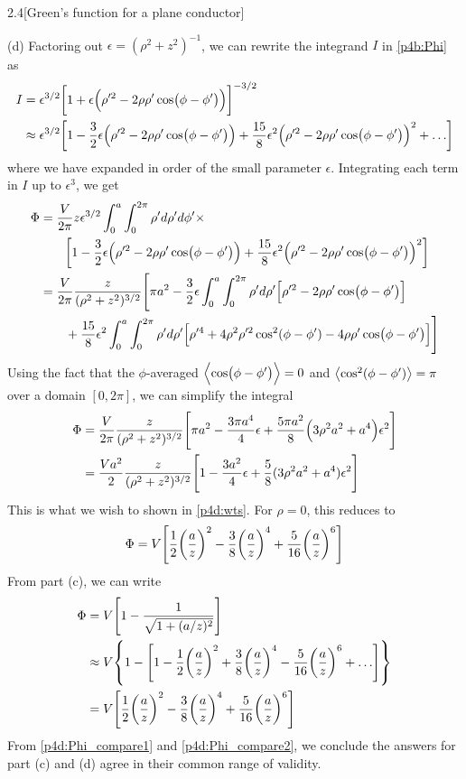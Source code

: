 \documentclass[12pt]{article}
\begin{document}
\begin{problem}{2.4}[Green's function for a plane conductor]
\begin{solution}
(d) Factoring out $\epsilon=(\rho^2+z^2)^{-1}$, we can rewrite the integrand
$I$ in \eqref{p4b:Phi} as
\begin{align}
    I
    &=\epsilon^{3/2}\qty[1+\epsilon\qty(\rho'^2-2\rho\rho'\cos(\phi-\phi'))]^{-3/2}\notag\\
    &\approx\epsilon^{3/2}\qty[1
        -\frac32\epsilon\qty(\rho'^2-2\rho\rho'\cos(\phi-\phi'))
        +\frac{15}{8}\epsilon^2\qty(\rho'^2-2\rho\rho'\cos(\phi-\phi'))^2
        +\hdots
    ]
\end{align}
where we have expanded in order of the small parameter $\epsilon$. Integrating
each term in $I$ up to $\epsilon^3$, we get
\begin{align}\label{p4d:Phi}
    \Phi&=\frac{V}{2\pi}z\epsilon^{3/2}\int_0^a\int_0^{2\pi}\rho'd\rho'd\phi'\times\notag\\
    &\qquad\qty[1
        -\frac32\epsilon\qty(\rho'^2-2\rho\rho'\cos(\phi-\phi'))
        +\frac{15}{8}\epsilon^2\qty(\rho'^2-2\rho\rho'\cos(\phi-\phi'))^2
    ]\notag\\
    &=\frac{V}{2\pi}\frac{z}{(\rho^2+z^2)^{3/2}}\Bigg[
        \pi
        a^2-\frac32\epsilon\int_0^a\int_0^{2\pi}\rho'd\rho'\qty[\rho'^2-2\rho\rho'\cos(\phi-\phi')]\notag\\
    &\qquad+\frac{15}{8}\epsilon^2\int_0^a\int_0^{2\pi}\rho'd\rho'\qty[\rho'^4+4\rho^2\rho'^2\cos^2(\phi-\phi')-4\rho\rho'\cos(\phi-\phi')]
    \Bigg]
\end{align}
Using the fact that the $\phi$-averaged $\expval{\cos(\phi-\phi')}=0$ and
$\expval{\cos^2(\phi-\phi')}=\pi$ over a domain $[0,2\pi]$, we can simplify the
integral
\begin{align}\label{p4d:Phi_compare1}
    \Phi&=\frac{V}{2\pi}\frac{z}{(\rho^2+z^2)^{3/2}}
    \qty[\pi a^2-\frac{3\pi a^4}{4}\epsilon
    +\frac{5\pi a^2}{8}\qty(3\rho^2a^2+a^4)\epsilon^2]\notag\\
        &=\frac{Va^2}{2}\frac{z}{(\rho^2+z^2)^{3/2}}
        \qty[1-\frac{3a^2}{4}\epsilon+\frac58(3\rho^2a^2+a^4)\epsilon^2]
\end{align}
This is what we wish to shown in \eqref{p4d:wts}. For $\rho=0$, this reduces to
\begin{equation}
    \Phi=V\qty[\frac12\qty(\frac{a}{z})^2-\frac38\qty(\frac{a}{z})^4+\frac5{16}\qty(\frac{a}{z})^6] 
\end{equation}
From part (c), we can write
\begin{align}\label{p4d:Phi_compare2}
    \Phi
    &=V\qty[1-\frac{1}{\sqrt{1+(a/z)^2}}]\notag\\
    &\approx
    V\qty{1-\qty[1-\frac12\qty(\frac{a}{z})^2+\frac38\qty(\frac{a}{z})^4
    -\frac5{16}\qty(\frac{a}{z})^6+\hdots]}\notag\\
    &=V\qty[\frac12\qty(\frac{a}{z})^2-\frac38\qty(\frac{a}{z})^4
    +\frac5{16}\qty(\frac{a}{z})^6]
\end{align}
From \eqref{p4d:Phi_compare1} and \eqref{p4d:Phi_compare2}, we conclude the
answers for part (c) and (d) agree in their common range of validity.
\end{solution}
    
\end{problem}



    
\end{document}
